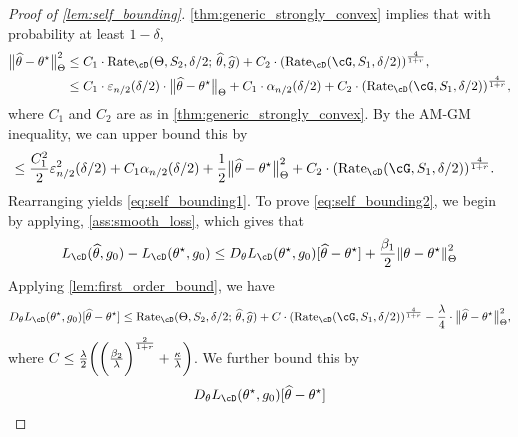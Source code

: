 \documentclass[11pt]{article} %
\newcommand{\pref}[1]{\cref{#1}}
\newcommand{\pfref}[1]{Proof of \pref{#1}}
\theoremstyle{theorem}  %
\theoremstyle{plain}
\DeclarePairedDelimiter{\prn}{(}{)}
\DeclarePairedDelimiter{\nrm}{\|}{\|}
\newcommand{\veps}{\varepsilon}
\newcommand{\wh}[1]{\widehat{#1}}
\newcommand{\midsem}{;\,}
\newcommand{\estone}{\wh{g}}
\newcommand{\esttwo}{\wh{\theta}}
\newcommand{\nuisance}{\cG}
\newcommand{\target}{\Theta}
\newcommand{\Rate}{\mathrm{Rate}_{\cD}}
\newcommand{\besttwo}{\theta^{\star}}
\newcommand{\gtone}{g_0}
\newcommand{\sampleone}{S_1}
\newcommand{\sampletwo}{S_2}
\begin{document}
\begin{proof}[\pfref{lem:self_bounding}]
  \pref{thm:generic_strongly_convex} implies that with probability at least $1-\delta$,
  \begin{align*}
\nrm[\big]{\esttwo-\besttwo}_{\target}^{2} &\leq{}
                                             C_1\cdot\Rate(\target,\sampletwo,\delta/2\midsem{}\esttwo,\estone)
                                             +
C_2\cdot
\prn*{\Rate(\nuisance,\sampleone,\delta/2)
                                             }^{\frac{4}{1+r}},\\
                                           &\leq{} C_1\cdot\veps_{n/2}(\delta/2)\cdot{}\nrm[\big]{\esttwo-\besttwo}_{\target}+C_1\cdot\alpha_{n/2}(\delta/2)
+ C_2\cdot{}\prn*{
\Rate(\nuisance,\sampleone,\delta/2)
                                             }^{\frac{4}{1+r}},
                                             \end{align*}
where $C_1$ and $C_2$ are as in \pref{thm:generic_strongly_convex}. By the AM-GM inequality, we can upper bound this by
\begin{align*}
                                           &\leq{}
                                             \frac{C_1^2}{2}\veps^2_{n/2}(\delta/2)
                                             + C_1\alpha_{n/2}(\delta/2)
                                             + \frac{1}{2}\nrm[\big]{\esttwo-\besttwo}_{\target}^2+
C_2\cdot{}\prn*{
\Rate(\nuisance,\sampleone,\delta/2)
                                             }^{\frac{4}{1+r}}.
  \end{align*}
Rearranging yields \pref{eq:self_bounding1}. To prove
\pref{eq:self_bounding2}, we begin by applying,
\pref{ass:smooth_loss}, which gives that
\[
  L_{\cD}(\esttwo,\gtone) - L_{\cD}(\besttwo, \gtone)
  \leq D_{\theta}L_{\cD}(\besttwo,\gtone)[\esttwo-\besttwo]
  + \frac{\beta_1}{2}\nrm*{\theta-\besttwo}_{\target}^{2}
\]
Applying \pref{lem:first_order_bound}, we have
\begin{align*}
D_{\theta}L_{\cD}(\besttwo,\gtone)[\esttwo-\besttwo] \leq{}  
 \Rate(\target,\sampletwo,\delta/2\midsem{}\esttwo,\estone) +
 C \cdot{}\prn*{
\Rate(\nuisance,\sampleone,\delta/2)
}^{\frac{4}{1+r}}
 -\frac{\lambda}{4}\cdot{}\nrm[\big]{\esttwo-\besttwo}_{\target}^{2},
\end{align*}
 where $C\leq{}
 \frac{\lambda}{2}\prn[\bigg]{\prn[\bigg]{\frac{\beta_2}{\lambda}}^{\frac{2}{1+r}}
   + \frac{\kappa}{\lambda}}$. We further bound this by
   \begin{align*}
     D_{\theta}L_{\cD}(\besttwo,\gtone)[\esttwo-\besttwo]

\end{align*}
\end{proof}
\end{document}

